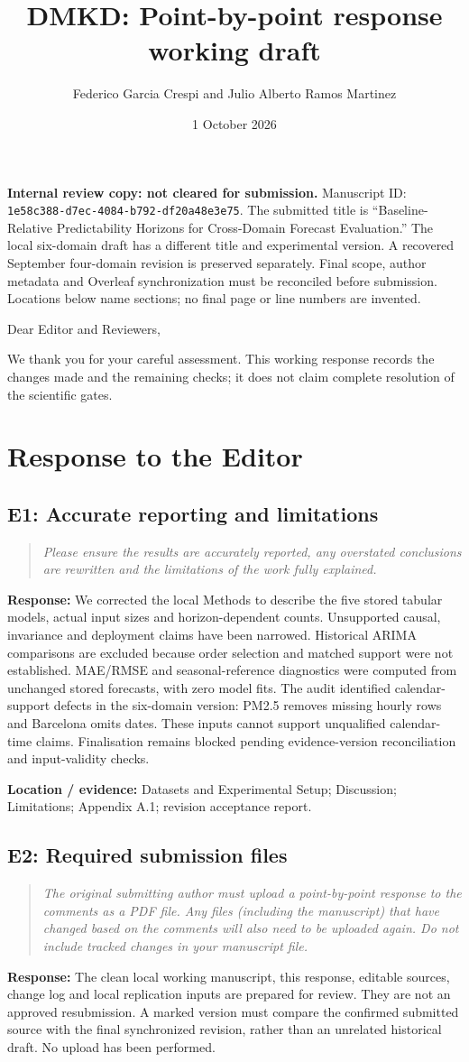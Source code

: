 \documentclass[11pt,a4paper]{article}
\title{DMKD: Point-by-point response working draft}
\author{Federico Garcia Crespi and Julio Alberto Ramos Martinez}
\date{1 October 2026}
\newcommand{\comment}[2]{\subsection*{#1}\begin{quote}\emph{#2}\end{quote}}
\newcommand{\response}[1]{\noindent\textcolor{responseblue}{\textbf{Response:}} #1\par\medskip}
\newcommand{\location}[1]{\noindent\textbf{Location / evidence:} #1\par\medskip}
\begin{document}
\maketitle
\noindent\textbf{Internal review copy: not cleared for submission.}
Manuscript ID: \nolinkurl{1e58c388-d7ec-4084-b792-df20a48e3e75}.
The submitted title is ``Baseline-Relative Predictability Horizons for
Cross-Domain Forecast Evaluation.'' The local six-domain draft has a different
title and experimental version. A recovered September four-domain revision
is preserved separately. Final scope, author metadata and Overleaf
synchronization must be reconciled before submission. Locations below name
sections; no final page or line numbers are invented.

\medskip\noindent Dear Editor and Reviewers,

We thank you for your careful assessment. This working response records the
changes made and the remaining checks; it does not claim complete resolution
of the scientific gates.

\section*{Response to the Editor}
\comment{E1: Accurate reporting and limitations}{Please ensure the results are accurately reported, any overstated conclusions are rewritten and the limitations of the work fully explained.}
\response{We corrected the local Methods to describe the five stored tabular models, actual input sizes and horizon-dependent counts. Unsupported causal, invariance and deployment claims have been narrowed. Historical ARIMA comparisons are excluded because order selection and matched support were not established. MAE/RMSE and seasonal-reference diagnostics were computed from unchanged stored forecasts, with zero model fits. The audit identified calendar-support defects in the six-domain version: PM2.5 removes missing hourly rows and Barcelona omits dates. These inputs cannot support unqualified calendar-time claims. Finalisation remains blocked pending evidence-version reconciliation and input-validity checks.}
\location{Datasets and Experimental Setup; Discussion; Limitations; Appendix A.1; revision acceptance report.}
\comment{E2: Required submission files}{The original submitting author must upload a point-by-point response to the comments as a PDF file. Any files (including the manuscript) that have changed based on the comments will also need to be uploaded again. Do not include tracked changes in your manuscript file.}
\response{The clean local working manuscript, this response, editable sources, change log and local replication inputs are prepared for review. They are not an approved resubmission. A marked version must compare the confirmed submitted source with the final synchronized revision, rather than an unrelated historical draft. No upload has been performed.}
\end{document}
